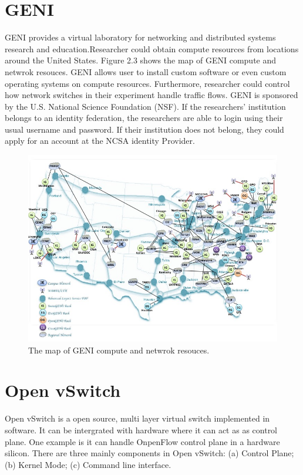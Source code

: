 \documentclass[a4paper,12pt]{report}
\begin{document}
\begin{CJK*}{UTF8}{bkai}
\begin{large}
      \section{GENI}
      \qquad GENI \cite{GENI} provides a virtual laboratory for networking and 		 distributed systems research and education.Researcher could obtain compute resources from locations around the United States. Figure 2.3 shows the map of GENI compute and netwrok resouces. GENI allows user to install custom software or even custom operating systems on compute resources. Furthermore, researcher could control how network switches in their experiment handle traffic flows. GENI is sponsored by the U.S. National Science Foundation (NSF). If the researchers' institution belongs to an identity federation, the researchers are able to login using their usual username and password. If their institution does not belong, they could apply for an account at the NCSA identity Provider.
      \begin{figure}[h]
          \caption{The map of GENI compute and netwrok resouces.}
          \centering
            \includegraphics[width=1.0\textwidth]{GENI-MAP.jpg}
      \end{figure}
     \section{Open vSwitch}
     \qquad Open vSwitch \cite{openvswitch} is a open source, multi layer virtual switch implemented in software. It can be intergrated with hardware where it can act as as control plane. One example is it can handle OnpenFlow control plane in a hardware silicon. There are three mainly components in Open vSwitch: (a) Control Plane; (b) Kernel Mode; (c) Command line interface. 

\end{large}
\end{CJK*}
\end{document}
